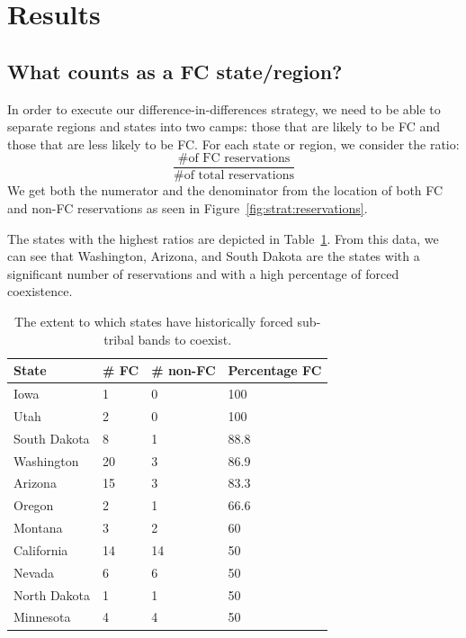 \documentclass[12pt]{article}
\begin{document}
\section{Results}

\subsection{What counts as a FC state/region?}
In order to execute our difference-in-differences strategy, we need to be able to separate regions and states into two camps: those that are likely to be FC and those that are less likely to be FC. For each state or region, we consider the ratio:
$$\frac{\mbox{\# of FC reservations}}{\mbox{\# of total reservations}}$$
We get both the numerator and the denominator from the location of both FC and non-FC reservations as seen in Figure~\ref{fig:strat:reservations}.

The states with the highest ratios are depicted in Table~\ref{fcpercent}.  From this data, we can see that Washington, Arizona, and South Dakota are the states with a significant number of reservations and with a high percentage of forced coexistence.

\begin{table}[ht!]
	\centering
    \begin{tabular}{ | l | l | l | l | }\hline\hline
    State        & \# FC & \# non-FC & Percentage FC \\\hline
	Iowa         & 1     & 0         & 100           \\
	Utah         & 2     & 0         & 100           \\
    South Dakota & 8     & 1         & 88.8          \\
	Washington   & 20    & 3         & 86.9          \\
    Arizona      & 15    & 3         & 83.3          \\
	Oregon       & 2     & 1         & 66.6          \\
    Montana      & 3     & 2         & 60            \\
    California   & 14    & 14        & 50            \\
    Nevada       & 6     & 6         & 50            \\
    North Dakota & 1     & 1         & 50            \\
    Minnesota    & 4     & 4         & 50            \\\hline
    \end{tabular}
    \caption{The extent to which states have historically forced sub-tribal bands to coexist.}
    \label{fcpercent}
\end{table}
\end{document}
